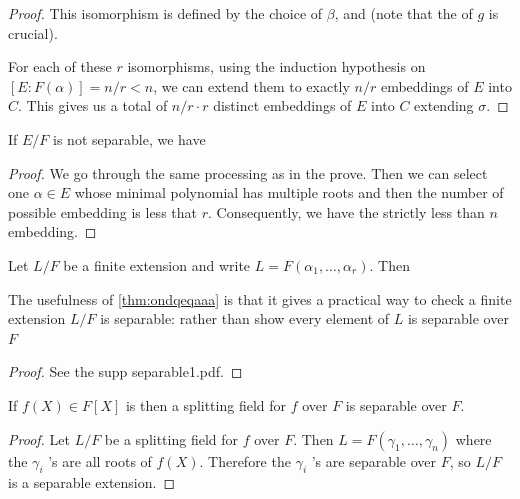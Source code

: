\documentclass{article}
\begin{document}
\begin{proof}
This isomorphism is defined by the choice of $\beta$, and  (note that the  of $g$ is crucial). 

For each of these $r$ isomorphisms, using the induction hypothesis on $[E: F(\alpha)]=n / r<n$, we can extend them to exactly $n / r$ embeddings of $E$ into $C$. This gives us a total of $n / r \cdot r$ distinct embeddings of $E$ into $C$ extending $\sigma$. 
\end{proof}



\begin{cora}
    If $E/F$ is not separable, we have 
\end{cora}
\begin{proof}
We go through the same processing as in the prove. Then we can select one $\alpha \in E$ whose minimal polynomial has multiple roots and then the number of possible embedding is less that $r$. Consequently, we have the strictly less than $n$ embedding.
\end{proof}
\begin{cora}\label{thm:ondqeqaaa}
Let $L / F$ be a finite extension and write $L=F\left(\alpha_{1}, \ldots, \alpha_{r}\right)$. Then 

\centerline{}
\end{cora} 
\begin{rema}
The usefulness of \cref{thm:ondqeqaaa} is that it gives a practical way to check a finite extension $L / F$ is separable: rather than show every element of $L$ is separable over $F$ 
\end{rema}
\begin{proof}
See the supp separable1.pdf.
\end{proof}
\begin{cora}
    If $f(X) \in F[X]$ is  then a splitting field for $f$ over $F$ is separable over $F$.
\end{cora}
\begin{proof}
Let $L / F$ be a splitting field for $f$ over $F$. Then $L=F\left(\gamma_{1}, \ldots, \gamma_{n}\right)$ where the $\gamma_{i}$ 's are all roots of $f(X)$. Therefore the $\gamma_{i}$ 's are separable over $F$, so $L / F$ is a separable extension.
\end{proof} 
\end{document}
